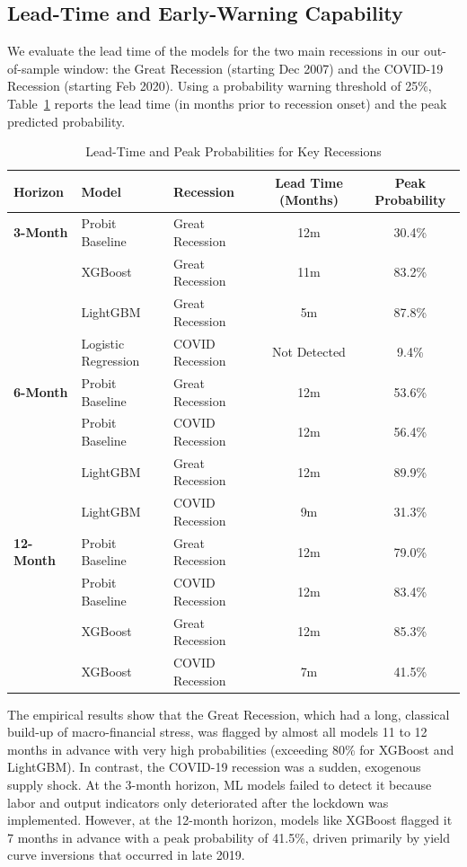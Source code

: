 \documentclass[11pt]{article}
\begin{document}
\subsection{Lead-Time and Early-Warning Capability}
We evaluate the lead time of the models for the two main recessions in our out-of-sample window: the Great Recession (starting Dec 2007) and the COVID-19 Recession (starting Feb 2020). Using a probability warning threshold of 25\%, Table~\ref{tab:leadtime} reports the lead time (in months prior to recession onset) and the peak predicted probability.

\begin{table}[H]
\centering
\caption{Lead-Time and Peak Probabilities for Key Recessions}
\label{tab:leadtime}
\begin{tabular}{lllcc}
\toprule
\textbf{Horizon} & \textbf{Model} & \textbf{Recession} & \textbf{Lead Time (Months)} & \textbf{Peak Probability} \\
\midrule
\textbf{3-Month} & Probit Baseline & Great Recession & 12m & 30.4\% \\
 & XGBoost & Great Recession & 11m & 83.2\% \\
 & LightGBM & Great Recession & 5m & 87.8\% \\
 & Logistic Regression & COVID Recession & Not Detected & 9.4\% \\
\midrule
\textbf{6-Month} & Probit Baseline & Great Recession & 12m & 53.6\% \\
 & Probit Baseline & COVID Recession & 12m & 56.4\% \\
 & LightGBM & Great Recession & 12m & 89.9\% \\
 & LightGBM & COVID Recession & 9m & 31.3\% \\
\midrule
\textbf{12-Month} & Probit Baseline & Great Recession & 12m & 79.0\% \\
 & Probit Baseline & COVID Recession & 12m & 83.4\% \\
 & XGBoost & Great Recession & 12m & 85.3\% \\
 & XGBoost & COVID Recession & 7m & 41.5\% \\
\bottomrule
\end{tabular}
\end{table}

The empirical results show that the Great Recession, which had a long, classical build-up of macro-financial stress, was flagged by almost all models 11 to 12 months in advance with very high probabilities (exceeding 80\% for XGBoost and LightGBM). In contrast, the COVID-19 recession was a sudden, exogenous supply shock. At the 3-month horizon, ML models failed to detect it because labor and output indicators only deteriorated after the lockdown was implemented. However, at the 12-month horizon, models like XGBoost flagged it 7 months in advance with a peak probability of 41.5\%, driven primarily by yield curve inversions that occurred in late 2019.
\end{document}
